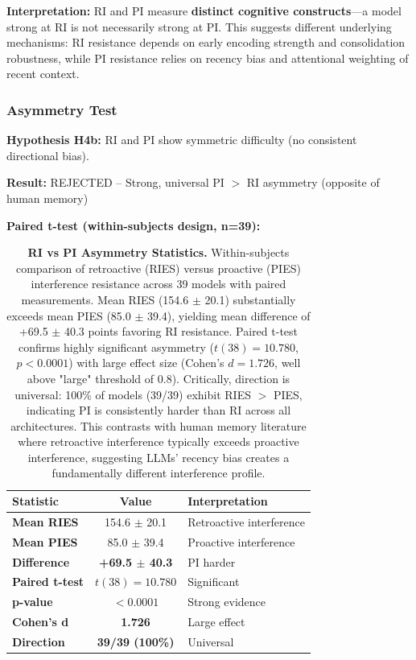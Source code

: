 \documentclass{article}
\begin{document}
\textbf{Interpretation:} RI and PI measure \textbf{distinct cognitive constructs}---a model strong at RI is not necessarily strong at PI. This suggests different underlying mechanisms: RI resistance depends on early encoding strength and consolidation robustness, while PI resistance relies on recency bias and attentional weighting of recent context.

\subsubsection{Asymmetry Test}

\textbf{Hypothesis H4b:} RI and PI show symmetric difficulty (no consistent directional bias).

\textbf{Result:} REJECTED -- Strong, universal PI $>$ RI asymmetry (opposite of human memory)

\textbf{Paired t-test (within-subjects design, n=39):}

\begin{table}[t]
\centering
\small
\caption{\textbf{RI vs PI Asymmetry Statistics.}
Within-subjects comparison of retroactive (RIES) versus proactive (PIES) interference resistance across 39 models with paired measurements.
Mean RIES (154.6 $\pm$ 20.1) substantially exceeds mean PIES (85.0 $\pm$ 39.4), yielding mean difference of +69.5 $\pm$ 40.3 points favoring RI resistance.
Paired t-test confirms highly significant asymmetry ($t(38) = 10.780$, $p < 0.0001$) with large effect size (Cohen's $d = 1.726$, well above "large" threshold of 0.8).
Critically, direction is universal: 100\% of models (39/39) exhibit RIES $>$ PIES, indicating PI is consistently harder than RI across all architectures.
This contrasts with human memory literature where retroactive interference typically exceeds proactive interference, suggesting LLMs' recency bias creates a fundamentally different interference profile.}
\setlength{\tabcolsep}{4pt}
\begin{tabular}{@{}lcp{3.2cm}@{}}
\toprule
Statistic & Value & Interpretation \\
\midrule
\textbf{Mean RIES} & 154.6 $\pm$ 20.1 & Retroactive interference \\
\textbf{Mean PIES} & 85.0 $\pm$ 39.4 & Proactive interference \\
\textbf{Difference} & \textbf{+69.5 $\pm$ 40.3} & PI harder \\
\textbf{Paired t-test} & $t(38) = 10.780$ & Significant \\
\textbf{p-value} & \textbf{$< 0.0001$} & Strong evidence \\
\textbf{Cohen's d} & \textbf{1.726} & Large effect \\
\textbf{Direction} & \textbf{39/39 (100\%)} & Universal \\
\bottomrule
\end{tabular}
\end{table}
\end{document}
